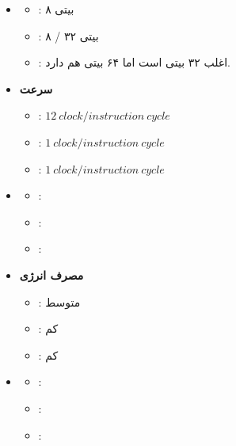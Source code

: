 \begin{itemize}
	\item \textbf{}
	\begin{itemize}
		\item {}:  ۸ بیتی
		\item {}: ۸ / ۳۲ بیتی
		\item {}: اغلب ۳۲ بیتی است اما ۶۴ بیتی هم دارد.
	\end{itemize}

	\item \textbf{سرعت}
	\begin{itemize}
		\item {}: 
		$12 \: clock / instruction \: cycle$
		\item {}:
		$1\:clock / instruction\:cycle$
		\item {}:
		$1\:clock / instruction\:cycle$
	\end{itemize}

	\item \textbf{}
	\begin{itemize}
		\item {}: 
		\item {}:  
		\item {}: 
	\end{itemize}
	
	\item \textbf{مصرف انرژی}
	\begin{itemize}
		\item {}: متوسط
		\item {}: کم
		\item {}: کم
	\end{itemize}

	\item \textbf{}
	\begin{itemize}
		\item {}: 
		\item {}: 
		\item {}: 
	\end{itemize}
\end{itemize}